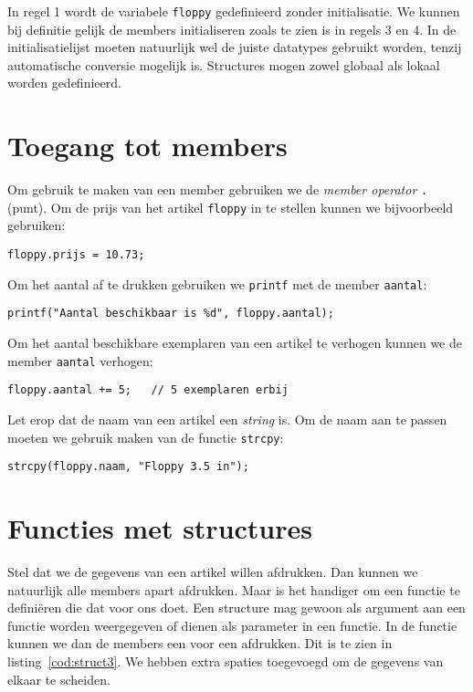
In regel 1 wordt de variabele \texttt{floppy} gedefinieerd zonder initialisatie. We kunnen bij definitie gelijk de members initialiseren zoals te zien is in regels 3 en 4. In de initialisatielijst moeten natuurlijk wel de juiste datatypes gebruikt worden, tenzij automatische conversie mogelijk is. Structures mogen zowel globaal als lokaal worden gedefinieerd.

\section{Toegang tot members}
Om gebruik te maken van een member gebruiken we de \textsl{member operator} \texttt{.} (punt). Om de prijs van het artikel \texttt{floppy} in te stellen kunnen we bijvoorbeeld gebruiken:

\hspace*{1em}\texttt{floppy.prijs = 10.73;}

Om het aantal af te drukken gebruiken we \texttt{printf} met de member \texttt{aantal}:

\hspace*{1em}\texttt{printf("Aantal beschikbaar is \%d", floppy.aantal);}

Om het aantal beschikbare exemplaren van een artikel te verhogen kunnen we de member \texttt{aantal} verhogen:

\hspace*{1em}\texttt{floppy.aantal += 5; \ \ // 5 exemplaren erbij}

Let erop dat de naam van een artikel een \textsl{string} is. Om de naam aan te passen moeten we gebruik maken van de functie \texttt{strcpy}:

\hspace*{1em}\texttt{strcpy(floppy.naam, "Floppy 3.5 in");}

\section{Functies met structures}
Stel dat we de gegevens van een artikel willen afdrukken. Dan kunnen we natuurlijk alle members apart afdrukken. Maar is het handiger om een functie te definiëren die dat voor ons doet. Een structure mag gewoon als argument aan een functie worden weergegeven of dienen als parameter in een functie. In de functie kunnen we dan de members een voor een afdrukken. Dit is te zien in listing~\ref{cod:struct3}. We hebben extra spaties toegevoegd om de gegevens van elkaar te scheiden.


